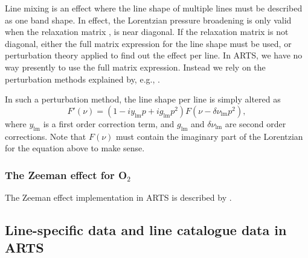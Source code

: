 Line mixing is an effect where the line shape of multiple lines must be described as one
band shape.  In effect, the Lorentzian pressure broadening is only valid when the relaxation
matrix \citep[see, e.g., equation 9 of][]{ben-reuven66:_impact_pr}, is near diagonal.
If the relaxation matrix is not diagonal, either the full matrix expression for the 
line shape must be used, or perturbation theory applied to find out the effect per line.
In ARTS, we have no way presently to use the full matrix expression. Instead we rely on the 
perturbation methods explained by, e.g., \citet{smith81_jcp_absorption}.

In such a perturbation method, the line shape per line is simply altered as
\begin{equation}
  F'(\nu) = (1-iy_{\mathrm{lm}}p+ig_{\mathrm{lm}}p^2)F(\nu-\delta\nu_{\mathrm{lm}}p^2),
  \label{eq:abs:lm:2ndorder}
\end{equation}
where $y_{\mathrm{lm}}$ is a first order correction term, and $g_{\mathrm{lm}}$ and 
$\delta\nu_{\mathrm{lm}}$ are second order corrections.  Note that $F(\nu)$ must contain
the imaginary part of the Lorentzian for the equation above to make sense.

\subsubsection{The Zeeman effect for O$_2$}

The Zeeman effect implementation in ARTS is described by \citet{larsson14:_treatment_jqsrt}.

\subsection{Line-specific data and line catalogue data in ARTS} 
\label{sec:abs_theory:catalogue_formats}

